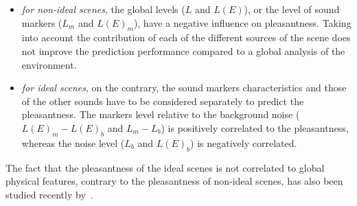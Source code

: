 \documentclass[12pt]{elsarticle}
\newcommand{\cf}{cf.}
\begin{document}
\begin{itemize}
\begin{itemize}
\item \emph{for non-ideal scenes}, the global levels ($L$ and $L(E)$), or the level of sound markers ($L_m$ and $L(E)_{m}$), have a negative influence on pleasantness. Taking into account the contribution of each of the different sources of the scene does not improve the prediction performance compared to a global analysis of the environment.


\item \emph{for ideal scenes}, on the contrary, the sound markers characteristics and those of the other sounds have to be considered separately to predict the pleasantness. The markers level relative to the background noise ($L(E)_m-L(E)_b$ and $L_m-L_b$) is positively correlated to the pleasantness, whereas the noise level ($L_b$ and $L(E)_b$) is negatively correlated.

\end{itemize}
\end{itemize}



The fact that the pleasantness of the ideal scenes is not correlated to global physical features, contrary to the pleasantness of non-ideal scenes, has also been studied recently by~\cite{gozalo2015relationship}.

\end{document}
